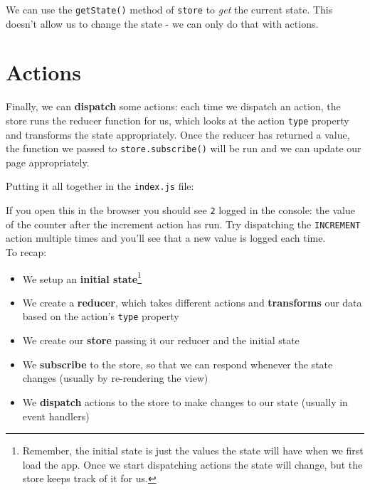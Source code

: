We can use the \texttt{getState()} method of \texttt{store} to \textit{get} the current state. This doesn't allow us to change the state - we can only do that with actions.




\section{Actions}

Finally, we can \textbf{dispatch} some actions: each time we dispatch an action, the store runs the reducer function for us, which looks at the action \texttt{type} property and transforms the state appropriately. Once the reducer has returned a value, the function we passed to \texttt{store.subscribe()} will be run and we can update our page appropriately.


\hr


Putting it all together in the \texttt{index.js} file:


If you open this in the browser you should see \texttt{2} logged in the console: the value of the counter after the increment action has run. Try dispatching the \texttt{INCREMENT} action multiple times and you'll see that a new value is logged each time.
\\

To recap:

\begin{itemize}
    \item We setup an \textbf{initial state}\footnote{Remember, the initial state is just the values the state will have when we first load the app. Once we start dispatching actions the state will change, but the store keeps track of it for us.}
    \item We create a \textbf{reducer}, which takes different actions and \textbf{transforms} our data based on the action's \texttt{type} property
    \item We create our \textbf{store} passing it our reducer and the initial state
    \item We \textbf{subscribe} to the store, so that we can respond whenever the state changes (usually by re-rendering the view)
    \item We \textbf{dispatch} actions to the store to make changes to our state (usually in event handlers)
\end{itemize}

